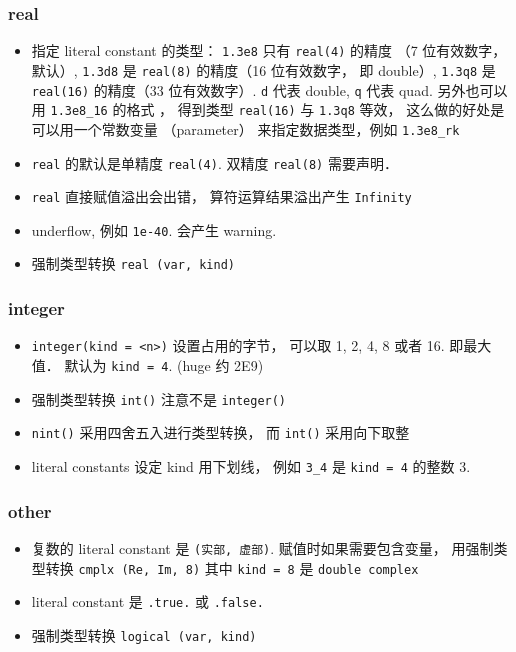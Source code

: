\subsubsection{real}
\begin{itemize}
\item 指定 literal constant 的类型： \verb|1.3e8| 只有 \verb|real(4)| 的精度 （7 位有效数字， 默认）, \verb|1.3d8| 是 \verb|real(8)| 的精度（16 位有效数字， 即 double）, \verb|1.3q8| 是 \verb|real(16)| 的精度（33 位有效数字）. \verb|d| 代表 double, \verb|q| 代表 quad. 另外也可以用 \verb|1.3e8_16| 的格式 ， 得到类型  \verb|real(16)| 与 \verb|1.3q8| 等效， 这么做的好处是可以用一个常数变量 （parameter） 来指定数据类型，例如 \verb|1.3e8_rk|
\item \verb|real| 的默认是单精度 \verb|real(4)|. 双精度 \verb|real(8)| 需要声明．
\item \verb|real| 直接赋值溢出会出错， 算符运算结果溢出产生 \verb|Infinity|
\item underflow, 例如 \verb|1e-40|. 会产生 warning.
\item 强制类型转换 \verb|real (var, kind)|
\end{itemize}

\subsubsection{integer}
\begin{itemize}
\item \verb`integer(kind = <n>)` 设置占用的字节， 可以取 1, 2, 4, 8 或者 16. 即最大值． 默认为 
   \verb|kind = 4|. (huge 约 2E9)
\item 强制类型转换 \verb|int()| 注意不是 \verb|integer()|
\item \verb`nint()` 采用四舍五入进行类型转换， 而 \verb|int()| 采用向下取整
\item literal constants 设定 kind 用下划线， 例如 \verb`3_4` 是 \verb`kind = 4` 的整数 3.
\end{itemize}

\subsubsection{other}
\begin{itemize}
\item 复数的 literal constant 是 \verb|(实部, 虚部)|. 赋值时如果需要包含变量， 用强制类型转换 \verb|cmplx (Re, Im, 8)| 其中 \verb|kind = 8| 是 \verb|double complex|
\item literal constant 是 \verb|.true.| 或 \verb|.false.|
\item 强制类型转换 \verb|logical (var, kind)|
\end{itemize}

